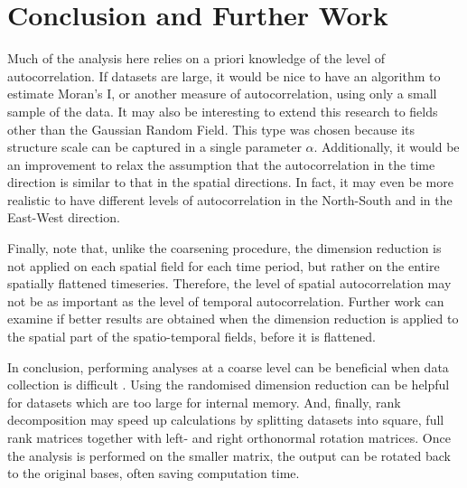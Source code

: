 \documentclass[sigconf]{acmart}
\begin{document}
\section{Conclusion and Further Work}
\label{sec:Conclusion and Further Work}

Much of the analysis here relies on a priori knowledge of the level of autocorrelation. If datasets are large, it would be nice to have an algorithm to estimate Moran's I, or another measure of autocorrelation, using only a small sample of the data. It may also be interesting to extend this research to fields other than the Gaussian Random Field. This type was chosen because its structure scale can be captured in a single parameter $\alpha$. Additionally, it would be an improvement to relax the assumption that the autocorrelation in the time direction is similar to that in the spatial directions. In fact, it may even be more realistic to have different levels of autocorrelation in the North-South and in the East-West direction.

Finally, note that, unlike the coarsening procedure, the dimension reduction is not applied on each spatial field for each time period, but rather on the entire spatially flattened timeseries. Therefore, the level of spatial autocorrelation may not be as important as the level of temporal autocorrelation. Further work can examine if better results are obtained when the dimension reduction is applied to the spatial part of the spatio-temporal fields, before it is flattened.

In conclusion, performing analyses at a coarse level can be beneficial when data collection is difficult%
. Using the randomised dimension reduction can be helpful for datasets which are too large for internal memory. And, finally, rank decomposition may speed up calculations by splitting datasets into square, full rank matrices together with left- and right orthonormal rotation matrices. Once the analysis is performed on the smaller matrix, the output can be rotated back to the original bases, often saving computation time.



\end{document}
